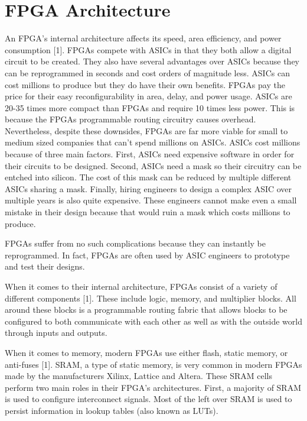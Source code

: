 \documentclass{article}
\begin{document}
    \section{FPGA Architecture}

    An FPGA's internal architecture affects its speed, area efficiency, and power consumption [1].
    FPGAs compete with ASICs in that they both allow a digital circuit to be created.
    They also have several advantages over ASICs because they can be reprogrammed in seconds
    and cost orders of magnitude less. ASICs can cost millions to produce but they do have
    their own benefits. FPGAs pay the price for their easy reconfigurability in area, delay,
    and power usage. ASICs are 20-35 times more compact than FPGAs and require 10 times less power.
    This is because the FPGAs programmable routing circuitry causes overhead. Nevertheless,
    despite these downsides, FPGAs are far more viable for small to medium sized companies
    that can't spend millions on ASICs. ASICs cost millions because of three main factors.
    First, ASICs need expensive software in order for their circuits to be designed.
    Second, ASICs need a mask so their circuitry can be entched into silicon.
    The cost of this mask can be reduced by multiple different ASICs sharing a mask.
    Finally, hiring engineers to design a complex ASIC over multiple years is also quite
    expensive. These engineers cannot make even a small mistake in their design
    because that would ruin a mask which costs millions to produce.

    FPGAs suffer from no such complications because they can instantly be reprogrammed.
    In fact, FPGAs are often used by ASIC engineers to prototype and test their designs.

    When it comes to their internal architecture, FPGAs consist of a variety of different
    components [1]. These include logic, memory, and multiplier blocks. All around these
    blocks is a programmable routing fabric that allows blocks to be configured to both
    communicate with each other as well as with the outside world through inputs and outputs.

    When it comes to memory, modern FPGAs use either flash, static memory, or anti-fuses [1].
    SRAM, a type of static memory, is very common in modern FPGAs made by the manufacturers
    Xilinx, Lattice and Altera. These SRAM cells perform two main roles in their FPGA's
    architectures. First, a majority of SRAM is used to configure interconnect signals.
    Most of the left over SRAM is used to persist information in lookup tables (also known as
    LUTs).
\end{document}
